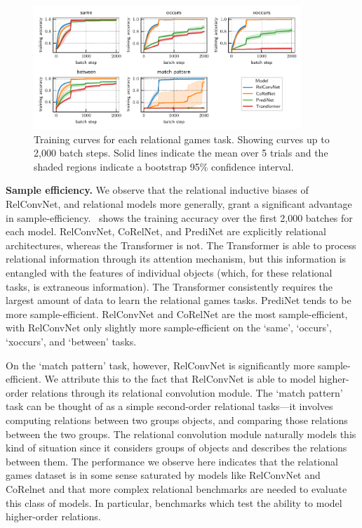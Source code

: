 \begin{figure}
    \centering
    \includegraphics[width=0.9\textwidth]{figs/experiments/all_training_curves.pdf}
    \caption{Training curves for each relational games task. Showing curves up to 2,000 batch steps. Solid lines indicate the mean over 5 trials and the shaded regions indicate a bootstrap 95\% confidence interval.}\label{fig:training_curves}
\end{figure}

\textbf{Sample efficiency.} We observe that the relational inductive biases of RelConvNet, and relational models more generally, grant a significant advantage in sample-efficiency.~ shows the training accuracy over the first 2,000 batches for each model. RelConvNet, CoRelNet, and PrediNet are explicitly relational architectures, whereas the Transformer is not. The Transformer is able to process relational information through its attention mechanism, but this information is entangled with the features of individual objects (which, for these relational tasks, is extraneous information). The Transformer consistently requires the largest amount of data to learn the relational games tasks. PrediNet tends to be more sample-efficient. RelConvNet and CoRelNet are the most sample-efficient, with RelConvNet only slightly more sample-efficient on the `same', `occurs', `xoccurs', and `between' tasks.

On the `match pattern' task, however, RelConvNet is significantly more sample-efficient. We attribute this to the fact that RelConvNet is able to model higher-order relations through its relational convolution module. The `match pattern' task can be thought of as a simple second-order relational tasks---it involves computing relations between two groups objects, and comparing those relations between the two groups. The relational convolution module naturally models this kind of situation since it considers groups of objects and describes the relations between them. The performance we observe here indicates that the relational games dataset is in some sense saturated by models like RelConvNet and CoRelnet and that more complex relational benchmarks are needed to evaluate this class of models. In particular, benchmarks which test the ability to model higher-order relations.


